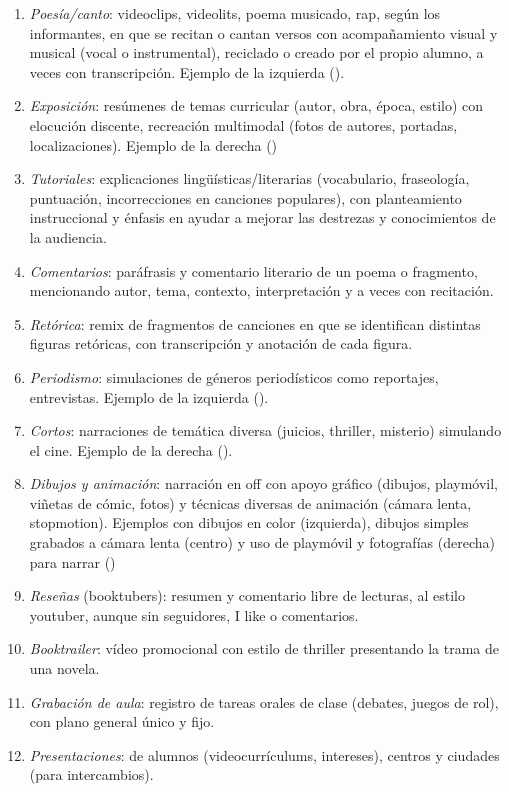 \documentclass[spanish]{textolivre}
\begin{document}
\begin{enumerate}
    \item \textit{Poesía/canto}: videoclips, videolits, poema musicado, rap, según los informantes, en que se recitan o cantan versos con acompañamiento visual y musical (vocal o instrumental), reciclado o creado por el propio alumno, a veces con transcripción. Ejemplo de la izquierda ().
    \item \textit{Exposición}: resúmenes de temas curricular (autor, obra, época, estilo) con elocución discente, recreación multimodal (fotos de autores, portadas, localizaciones). Ejemplo de la derecha ()
    \item \textit{Tutoriales}: explicaciones lingüísticas/literarias (vocabulario, fraseología, puntuación, incorrecciones en canciones populares), con planteamiento instruccional y énfasis en ayudar a mejorar las destrezas y conocimientos de la audiencia.
    \item \textit{Comentarios}: paráfrasis y comentario literario de un poema o fragmento, mencionando autor, tema, contexto, interpretación y a veces con recitación.
    \item \textit{Retórica}: remix de fragmentos de canciones en que se identifican distintas figuras retóricas, con transcripción y anotación de cada figura.
    \item \textit{Periodismo}: simulaciones de géneros periodísticos como reportajes, entrevistas. Ejemplo de la izquierda ().
    \item \textit{Cortos}: narraciones de temática diversa (juicios, thriller, misterio) simulando el cine. Ejemplo de la derecha ().
    \item \textit{Dibujos y animación}: narración en off con apoyo gráfico (dibujos, playmóvil, viñetas de cómic, fotos) y técnicas diversas de animación (cámara lenta, stopmotion). Ejemplos con dibujos en color (izquierda), dibujos simples grabados a cámara lenta (centro) y uso de playmóvil y fotografías (derecha) para narrar ()
    \item \textit{Reseñas} (booktubers): resumen y comentario libre de lecturas, al estilo youtuber, aunque sin seguidores, I like o comentarios.
    \item \textit{Booktrailer}: vídeo promocional con estilo de thriller presentando la trama de una novela.
    \item \textit{Grabación de aula}: registro de tareas orales de clase (debates, juegos de rol), con plano general único y fijo.
    \item \textit{Presentaciones}: de alumnos (videocurrículums, intereses), centros y ciudades (para intercambios).
\end{enumerate}
\end{document}
